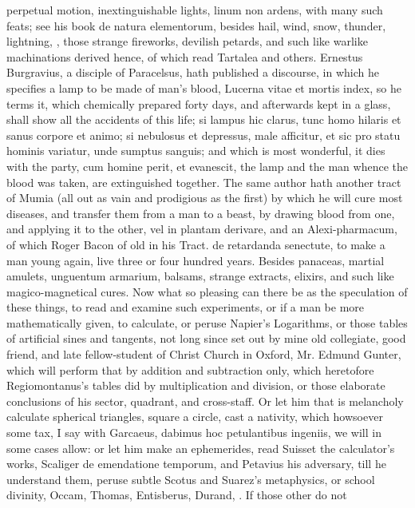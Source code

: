 {perpetual motion, inextinguishable lights, linum non ardens, with many
such feats; see his book de natura elementorum, besides hail, wind,
snow, thunder, lightning, \etc{}, those strange fireworks, devilish
petards, and such like warlike machinations derived hence, of which
read Tartalea and others. Ernestus Burgravius, a disciple of
Paracelsus, hath published a discourse, in which he specifies a lamp to
be made of man's blood, Lucerna vitae et mortis index, so he terms it,
which chemically prepared forty days, and afterwards kept in a glass,
shall show all the accidents of this life; si lampus hic clarus, tunc
homo hilaris et sanus corpore et animo; si nebulosus et depressus, male
afficitur, et sic pro statu hominis variatur, unde sumptus sanguis;
and which is most wonderful, it dies with the party, cum homine
perit, et evanescit, the lamp and the man whence the blood was taken,
are extinguished together. The same author hath another tract of Mumia
(all out as vain and prodigious as the first) by which he will cure
most diseases, and transfer them from a man to a beast, by drawing
blood from one, and applying it to the other, vel in plantam derivare,
and an Alexi-pharmacum, of which Roger Bacon of old in his Tract. de
retardanda senectute, to make a man young again, live three or four
hundred years. Besides panaceas, martial amulets, unguentum armarium,
balsams, strange extracts, elixirs, and such like magico-magnetical
cures. Now what so pleasing can there be as the speculation of these
things, to read and examine such experiments, or if a man be more
mathematically given, to calculate, or peruse Napier's Logarithms, or
those tables of artificial sines and tangents, not long since set
out by mine old collegiate, good friend, and late fellow-student of
Christ Church in Oxford, Mr. Edmund Gunter, which will perform
that by addition and subtraction only, which heretofore Regiomontanus's
tables did by multiplication and division, or those elaborate
conclusions of his sector, quadrant, and cross-staff. Or let him
that is melancholy calculate spherical triangles, square a circle, cast
a nativity, which howsoever some tax, I say with Garcaeus,
dabimus hoc petulantibus ingeniis, we will in some cases allow: or let
him make an ephemerides, read Suisset the calculator's works, Scaliger
de emendatione temporum, and Petavius his adversary, till he understand
them, peruse subtle Scotus and Suarez's metaphysics, or school
divinity, Occam, Thomas, Entisberus, Durand, \etc{}. If those other do not
}
